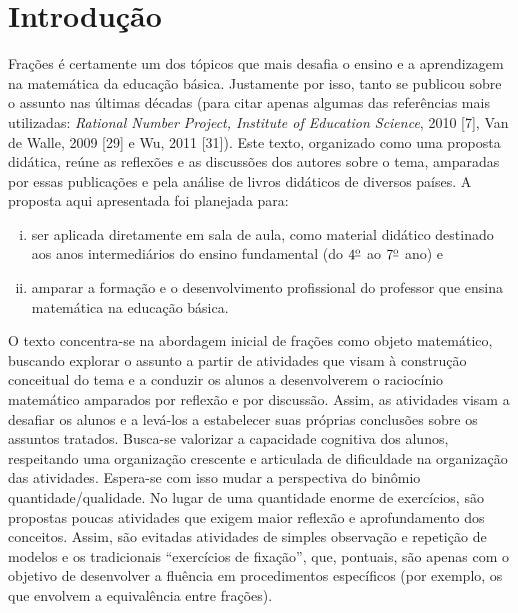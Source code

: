
% 
% 
% 


\chapter{Introdução}
 

Frações é certamente um dos tópicos que mais desafia o ensino e a aprendizagem na matemática da educação básica. Justamente por isso, tanto se publicou sobre o assunto nas últimas décadas (para citar apenas algumas das referências mais utilizadas:  {\it Rational Number Project, Institute of Education Science}, 2010 [7], Van de Walle, 2009 [29] e Wu, 2011 [31]). Este texto, organizado como uma proposta didática,  reúne as reflexões e as discussões dos autores sobre o tema, amparadas por essas publicações e pela análise de livros didáticos de diversos países. A proposta aqui apresentada foi planejada para:

\begin{enumerate}[(i)]
\item  ser aplicada diretamente em sala de aula, como material didático destinado aos anos intermediários do ensino fundamental (do $4^{\textrm{\underline{o}}}$ ao $7^{\textrm{\underline{o}}}$ ano) e 
\item amparar a formação e o desenvolvimento profissional do professor que ensina matemática na educação básica.
\end{enumerate}

O texto concentra-se na abordagem inicial de frações como objeto matemático, buscando explorar o assunto a partir de atividades que visam à construção conceitual do tema e a conduzir os alunos a desenvolverem o raciocínio matemático amparados por reflexão e por discussão. Assim, as atividades visam a desafiar os alunos e a levá-los a estabelecer suas próprias conclusões sobre os assuntos tratados. Busca-se valorizar a capacidade cognitiva dos alunos, respeitando uma organização crescente e articulada de diﬁculdade na organização das atividades. Espera-se com isso mudar a perspectiva do binômio quantidade/qualidade. No lugar de uma quantidade enorme de exercícios, são propostas poucas  atividades que exigem maior reflexão e aprofundamento dos conceitos. Assim, são evitadas atividades de simples observação e repetição de modelos e os tradicionais ``exercícios de fixação'', que, pontuais, são apenas com o objetivo de desenvolver a fluência em procedimentos específicos (por exemplo, os que envolvem a equivalência entre frações). 


